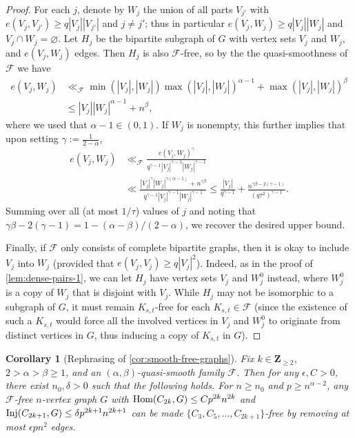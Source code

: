 \documentclass[reqno,11pt]{amsart}
\newtheorem{corollary}[theorem]{Corollary}
\theoremstyle{definition}
\theoremstyle{remark}
\numberwithin{equation}{section}
\newcommand{\Z}{\mathbf{Z}}
\newcommand{\mF}{\mathcal{F}}
\renewcommand{\emptyset}{\varnothing}
\newcommand{\Hom}{\textnormal{Hom}}
\newcommand{\Inj}{\textnormal{Inj}}
\begin{document}
\begin{proof}
For each $j$, denote by $W_j$ the union of all parts $V_{j'}$ with $e(V_j, V_{j'}) \ge q|V_j||V_{j'}|$ and $j \neq j'$; thus in particular $e(V_j, W_j) \ge q|V_j||W_j|$ and $V_j \cap W_j = \emptyset$. Let $H_j$ be the bipartite subgraph of $G$ with vertex sets $V_j$ and $W_j$, and $e(V_j, W_j)$ edges. Then $H_j$ is also $\mF$-free, so by the the quasi-smoothness of $\mF$ we have
\[
\begin{aligned}
    e(V_j, W_j) &\ll_\mF \min(|V_j|, |W_j|) \max(|V_j|, |W_j|)^{\alpha - 1} + \max(|V_j|, |W_j|)^\beta
    \\
    &\le |V_j| |W_j|^{\alpha - 1} + n^\beta,
\end{aligned}
\]
where we used that $\alpha - 1 \in (0, 1)$.
If $W_j$ is nonempty, this further implies that upon setting $\gamma := \frac{1}{2-\alpha}$,
\[
\begin{aligned}
    e(V_j, W_j) &\ll_\mF \frac{e(V_j, W_j)^\gamma}{q^{\gamma - 1} |V_j|^{\gamma - 1} |W_j|^{\gamma - 1}}
    \\
    &\ll 
    \frac{|V_j|^{\gamma} |W_j|^{\gamma(\alpha-1)} + n^{\gamma \beta}}{q^{\gamma - 1} |V_j|^{\gamma - 1} |W_j|^{\gamma - 1}}
    \le
    \frac{|V_j|}{q^{\gamma - 1}}
    + 
    \frac{n^{\gamma \beta - 2(\gamma - 1)}}{(q\tau^2)^{\gamma - 1}}.
\end{aligned}
\]
Summing over all (at most $1/\tau$) values of $j$ and noting that $\gamma \beta - 2(\gamma - 1) = 1 - (\alpha - \beta)/(2 - \alpha)$, we recover the desired upper bound.

Finally, if $\mF$ only consists of complete bipartite graphs, then it is okay to include $V_j$ into $W_j$ (provided that $e(V_j, V_j) \ge q|V_j|^2$). Indeed, as in the proof of \cref{lem:dense-pairs-1}, we can let $H_j$ have vertex sets $V_j$ and $W_j^0$ instead, where $W_j^0$ is a copy of $W_j$ that is disjoint with $V_j$. While $H_j$ may not be isomorphic to a subgraph of $G$, it must remain $K_{s,t}$-free for each $K_{s,t} \in \mF$ (since the existence of such a $K_{s,t}$ would force all the involved vertices in $V_j$ and $W_j^0$ to originate from distinct vertices in $G$, thus inducing a copy of $K_{s,t}$ in $G$). 
\end{proof}

\begin{corollary}[Rephrasing of \cref{cor:smooth-free-graphs}]
Fix $k \in \Z_{\ge 2}$, $2 > \alpha > \beta \ge 1$, and an $(\alpha, \beta)$-quasi-smooth family $\mF$. Then for any $\epsilon, C > 0$, there exist $n_0, \delta > 0$ such that the following holds. For $n \ge n_0$ and $p \ge n^{\alpha - 2}$, any $\mF$-free $n$-vertex graph $G$ with $\Hom(C_{2k}, G) \le Cp^{2k} n^{2k}$ and $\Inj(C_{2k+1}, G) \le \delta p^{2k+1} n^{2k+1}$ can be made $\{C_3, C_5, \ldots, C_{2k+1}\}$-free by removing at most $\epsilon pn^2$ edges. 
\end{corollary}
\end{document}

